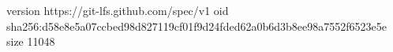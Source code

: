 version https://git-lfs.github.com/spec/v1
oid sha256:d58e8e5a07ccbed98d827119cf01f9d24fded62a0b6d3b8ee98a7552f6523e5e
size 11048
